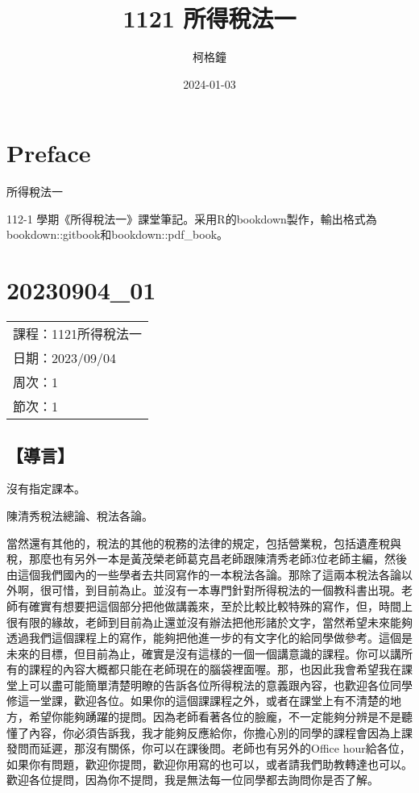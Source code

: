 \documentclass[]{ctexbook}
\title{1121 所得稅法一}
\author{柯格鐘}
\date{2024-01-03}
\begin{document}
\maketitle

% 

{
\setcounter{tocdepth}{2}
\tableofcontents
}



\hypertarget{preface}{%
\chapter*{Preface}\label{preface}}


所得稅法一

112-1 學期《所得稅法一》課堂筆記。采用R的bookdown製作，輸出格式為bookdown::gitbook和bookdown::pdf\_book。

\mainmatter

\hypertarget{section}{%
\chapter{20230904\_01}\label{section}}

\begin{longtable}[]{@{}l@{}}
\toprule()
\endhead
課程：1121所得稅法一 \\
日期：2023/09/04 \\
周次：1 \\
節次：1 \\
\bottomrule()
\end{longtable}

\hypertarget{ux5c0eux8a00}{%
\section{【導言】}\label{ux5c0eux8a00}}

沒有指定課本。

陳清秀稅法總論、稅法各論。

當然還有其他的，稅法的其他的稅務的法律的規定，包括營業稅，包括遺產稅與稅，那麼也有另外一本是黃茂榮老師葛克昌老師跟陳清秀老師3位老師主編，然後由這個我們國內的一些學者去共同寫作的一本稅法各論。那除了這兩本稅法各論以外啊，很可惜，到目前為止。並沒有一本專門針對所得稅法的一個教科書出現。老師有確實有想要把這個部分把他做講義來，至於比較比較特殊的寫作，但，時間上很有限的緣故，老師到目前為止還並沒有辦法把他形諸於文字，當然希望未來能夠透過我們這個課程上的寫作，能夠把他進一步的有文字化的給同學做參考。這個是未來的目標，但目前為止，確實是沒有這樣的一個一個講意識的課程。你可以講所有的課程的內容大概都只能在老師現在的腦袋裡面喔。那，也因此我會希望我在課堂上可以盡可能簡單清楚明瞭的告訴各位所得稅法的意義跟內容，也歡迎各位同學修這一堂課，歡迎各位。如果你的這個課課程之外，或者在課堂上有不清楚的地方，希望你能夠踴躍的提問。因為老師看著各位的臉龐，不一定能夠分辨是不是聽懂了內容，你必須告訴我，我才能夠反應給你，你擔心別的同學的課程會因為上課發問而延遲，那沒有關係，你可以在課後問。老師也有另外的Office hour給各位，如果你有問題，歡迎你提問，歡迎你用寫的也可以，或者請我們助教轉達也可以。歡迎各位提問，因為你不提問，我是無法每一位同學都去詢問你是否了解。
\end{document}
